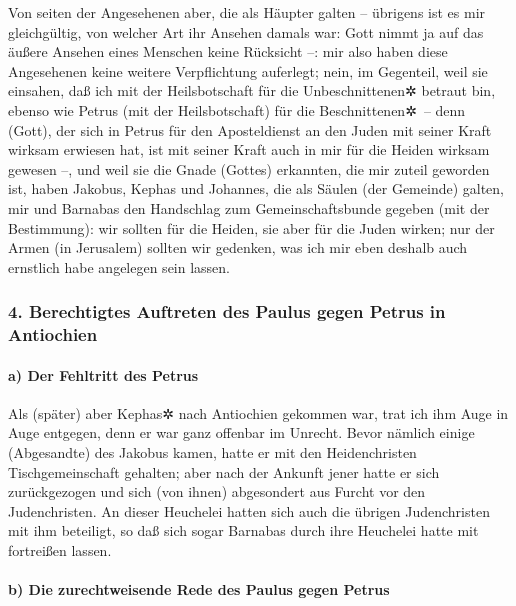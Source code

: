  Von seiten der Angesehenen aber, die als Häupter galten
-- übrigens ist es mir gleichgültig, von welcher Art ihr Ansehen damals
war: Gott nimmt ja auf das äußere Ansehen eines Menschen keine Rücksicht
--: mir also haben diese Angesehenen keine weitere Verpflichtung
auferlegt;  nein, im Gegenteil, weil sie einsahen, daß ich
mit der Heilsbotschaft für die Unbeschnittenen✲ betraut bin, ebenso wie
Petrus (mit der Heilsbotschaft) für die Beschnittenen✲~-- 
denn (Gott), der sich in Petrus für den Aposteldienst an den Juden mit
seiner Kraft wirksam erwiesen hat, ist mit seiner Kraft auch in mir für
die Heiden wirksam gewesen --,  und weil sie die Gnade
(Gottes) erkannten, die mir zuteil geworden ist, haben Jakobus, Kephas
und Johannes, die als Säulen (der Gemeinde) galten, mir und Barnabas den
Handschlag zum Gemeinschaftsbunde gegeben (mit der Bestimmung): wir
sollten für die Heiden, sie aber für die Juden wirken; 
nur der Armen (in Jerusalem) sollten wir gedenken, was ich mir eben
deshalb auch ernstlich habe angelegen sein lassen.

\hypertarget{berechtigtes-auftreten-des-paulus-gegen-petrus-in-antiochien}{%
\subsubsection{4. Berechtigtes Auftreten des Paulus gegen Petrus in
Antiochien}\label{berechtigtes-auftreten-des-paulus-gegen-petrus-in-antiochien}}

\hypertarget{a-der-fehltritt-des-petrus}{%
\paragraph{a) Der Fehltritt des
Petrus}\label{a-der-fehltritt-des-petrus}}

 Als (später) aber Kephas✲ nach Antiochien gekommen war,
trat ich ihm Auge in Auge entgegen, denn er war ganz offenbar im
Unrecht.  Bevor nämlich einige (Abgesandte) des Jakobus
kamen, hatte er mit den Heidenchristen Tischgemeinschaft gehalten; aber
nach der Ankunft jener hatte er sich zurückgezogen und sich (von ihnen)
abgesondert aus Furcht vor den Judenchristen.  An dieser
Heuchelei hatten sich auch die übrigen Judenchristen mit ihm beteiligt,
so daß sich sogar Barnabas durch ihre Heuchelei hatte mit fortreißen
lassen.

\hypertarget{b-die-zurechtweisende-rede-des-paulus-gegen-petrus}{%
\paragraph{b) Die zurechtweisende Rede des Paulus gegen
Petrus}\label{b-die-zurechtweisende-rede-des-paulus-gegen-petrus}}

